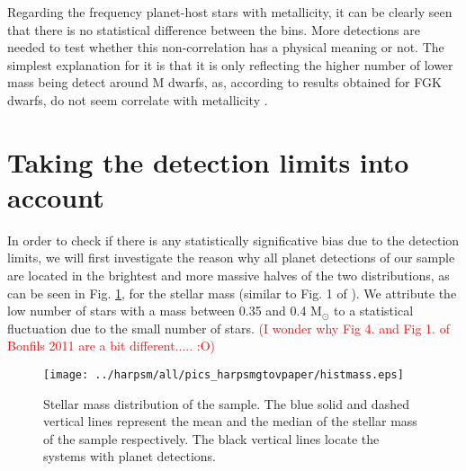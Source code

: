 \documentclass[structabstract]{aa}
\begin{document}
Regarding the frequency planet-host stars with metallicity, it can be clearly seen that there is no statistical difference between the bins. More detections are needed to test whether this non-correlation has a physical meaning or not. The simplest explanation for it is that it is only reflecting the higher number of lower mass being detect around M dwarfs, as, according to results obtained for FGK dwarfs, do not seem correlate with metallicity \citep[e.g.][]{Sousa-2011b}.



\section{Taking the detection limits into account}
\label{dl}

In order to check if there is any statistically significative bias due to the detection limits, we will first investigate the reason why all planet detections of our sample are located in the brightest and more massive halves of the two distributions, as can be seen in Fig. \ref{histmass}, for the stellar mass (similar to Fig. 1 of \citet{Bonfils-2011}). We attribute the low number of stars with a mass between 0.35 and 0.4 M$_{\odot}$ to a statistical fluctuation due to the small number of stars. \textcolor{red}{(I wonder why Fig 4. and Fig 1. of Bonfils 2011 are a bit different..... :O)}

\begin{figure}[h]
\begin{center}
\texttt{[image: ../harpsm/all/pics\_harpsmgtovpaper/histmass.eps]}
\end{center}
\caption{Stellar mass distribution of the sample. The blue solid and dashed vertical lines represent the mean and the median of the stellar mass of the sample respectively. The black vertical lines locate the systems with planet detections.}
\label{histmass}
\end{figure}
\end{document}
